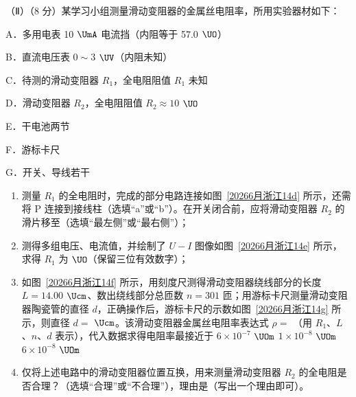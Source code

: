 \documentclass[\gkver]{gaokaozhenti}
\begin{document}
\begin{enumerate}
（Ⅱ）（8 分）某学习小组测量滑动变阻器的金属丝电阻率，所用实验器材如下：

A．多用电表 10 $\UmA$ 电流挡（内阻等于 57.0 $\UO$）

B．直流电压表 $0\sim3$ $\UV$（内阻未知）

C．待测的滑动变阻器 $R_{1}$，全电阻阻值 $R_{1}$ 未知

D．滑动变阻器 $R_{2}$，全电阻阻值 $R_{2}\approx10$ $\UO$

E．干电池两节

F．游标卡尺

G．开关、导线若干
\begin{enumerate}
    \item
    测量 $R_{1}$ 的全电阻时，完成的部分电路连接如图~\ref{20266月浙江14d} 所示，还需将 P 连接到接线柱（选填“a”或“b”）。在开关闭合前，应将滑动变阻器 $R_{2}$ 的滑片移至（选填“最左侧”或“最右侧”）；
    \item
    测得多组电压、电流值，并绘制了 $U-I$ 图像如图~\ref{20266月浙江14e} 所示，求得 $R_{1}$ 为 $\UO$（保留三位有效数字）；
    \item
    如图~\ref{20266月浙江14f} 所示，用刻度尺测得滑动变阻器绕线部分的长度 $L=14.00$ $\Ucm$、数出绕线部分总匝数 $n=301$ 匝；用游标卡尺测量滑动变阻器陶瓷管的直径 $d$，正确操作后，游标卡尺的示数如图~\ref{20266月浙江14g} 所示，则直径 $d=$  $\Ucm$。该滑动变阻器金属丝电阻率表达式 $\rho=$ （用 $R_{1}$、$L$、$n$、$d$ 表示），代入数据求得电阻率最接近于
    {$6\times10^{-7}$ $\UOm$}
    {$1\times10^{-8}$ $\UOm$}
    {$6\times10^{-8}$ $\UOm$}
    \item
    仅将上述电路中的滑动变阻器位置互换，用来测量滑动变阻器 $R_{2}$ 的全电阻是否合理？（选填“合理”或“不合理”），理由是（写出一个理由即可）。
\end{enumerate}


\end{enumerate}
\end{document}
